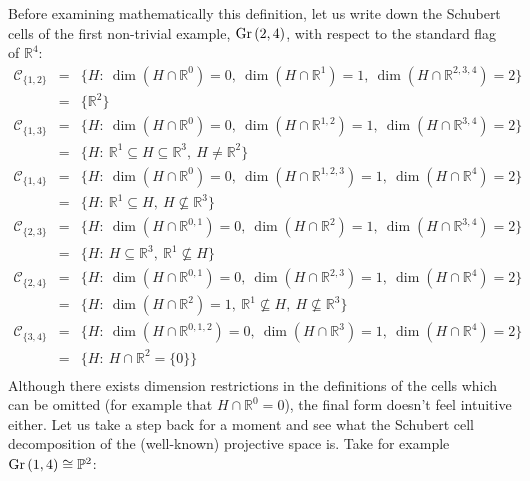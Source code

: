 Before examining mathematically this definition, let us write down the Schubert cells of the first non-trivial example, $\Gr{2}{4}$, with respect to the standard flag of $\mathbb{R}^4$:
\[\begin{array}{rcl}
\mathcal{C}_{\{1,2\}}&=&\big\{H:\ \dim(H\cap\mathbb{R}^{0})=0,\ \dim(H\cap\mathbb{R}^{1})=1,\ \dim(H\cap\mathbb{R}^{2,3,4})=2\big\}\\
&=&\big\{\mathbb{R}^2\big\}\\[.6em]
\mathcal{C}_{\{1,3\}}&=&\big\{H:\ \dim(H\cap\mathbb{R}^{0})=0,\ \dim(H\cap\mathbb{R}^{1,2})=1,\ \dim(H\cap\mathbb{R}^{3,4})=2\big\}\\
&=&\big\{H:\ \mathbb{R}^1\subseteq H\subseteq\mathbb{R}^3,\ H\neq\mathbb{R}^2\big\}\\[.6em]
\mathcal{C}_{\{1,4\}}&=&\big\{H:\ \dim(H\cap\mathbb{R}^{0})=0,\ \dim(H\cap\mathbb{R}^{1,2,3})=1,\ \dim(H\cap\mathbb{R}^{4})=2\big\}\\
&=&\big\{H:\ \mathbb{R}^1\subseteq H,\ H\not\subseteq\mathbb{R}^3\big\}\\[.6em]
\mathcal{C}_{\{2,3\}}&=&\big\{H:\ \dim(H\cap\mathbb{R}^{0,1})=0,\ \dim(H\cap\mathbb{R}^{2})=1,\ \dim(H\cap\mathbb{R}^{3,4})=2\big\}\\
&=&\big\{H:\ H\subseteq\mathbb{R}^3,\ \mathbb{R}^1\not\subseteq H\big\}\\[.6em]
\mathcal{C}_{\{2,4\}}&=&\big\{H:\ \dim(H\cap\mathbb{R}^{0,1})=0,\ \dim(H\cap\mathbb{R}^{2,3})=1,\ \dim(H\cap\mathbb{R}^{4})=2\big\}\\
&=&\big\{H:\ \dim(H\cap\mathbb{R}^2)=1,\ \mathbb{R}^1\not\subseteq H,\ H\not\subseteq\mathbb{R}^3\big\}\\[.6em]
\mathcal{C}_{\{3,4\}}&=&\big\{H:\ \dim(H\cap\mathbb{R}^{0,1,2})=0,\ \dim(H\cap\mathbb{R}^{3})=1,\ \dim(H\cap\mathbb{R}^{4})=2\big\}\\
&=&\big\{H:\ H\cap\mathbb{R}^2=\{0\}\big\}\\[.6em]
\end{array}\]
Although there exists dimension restrictions in the definitions of the cells which can be omitted (for example that $H\cap\mathbb{R}^0=0$), the final form doesn't feel intuitive either. Let us take a step back for a moment and see what the Schubert cell decomposition of the (well-known) projective space is. Take for example $\Gr{1}{4}\cong\mathbb{P}^2$:

